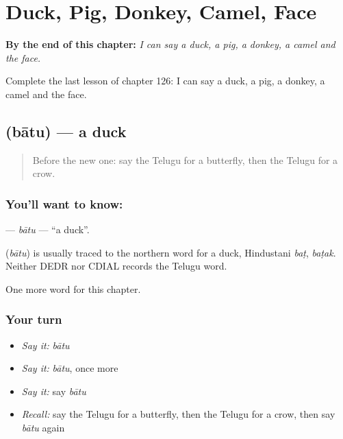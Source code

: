 
\chapter{Duck, Pig, Donkey, Camel, Face}
\label{ch:te-duck-pig-donkey-camel-face}

\begin{chapteropening}
\textbf{By the end of this chapter:} \emph{I can say a duck, a pig, a donkey, a camel and the face.}

Complete the last lesson of chapter 126: I can say a duck, a pig, a donkey, a camel and the face.
\end{chapteropening}

\section[\texorpdfstring{\te{బాతు} (bātu)}{బాతు (bātu)}]{ (bātu) — a duck}

\label{lesson:TE-C126-batu}



\begin{quote}
Before the new one: say the Telugu for a butterfly, then the Telugu for a crow.
\end{quote}

\subsection*{You'll want to know: }
\textbf{} — \emph{bātu} — \textquotedblleft{}a duck\textquotedblright{}.

\begin{cousinweb}
\textbf{} (\emph{bātu}) is usually traced to the northern word for a duck, Hindustani \emph{baṭ}, \emph{baṭak}. Neither DEDR nor CDIAL records the Telugu word.
\end{cousinweb}

\begin{grammarlens}[title={What you've built}]
One more word for this chapter.
\end{grammarlens}

\subsection*{Your turn}
\begin{itemize}
\raggedright
  \item \emph{Say it:} \emph{bātu}
  \item \emph{Say it:} \emph{bātu}, once more
  \item \emph{Say it:} say \emph{bātu}
  \item \emph{Recall:} say the Telugu for a butterfly, then the Telugu for a crow, then say \emph{bātu} again
\end{itemize}

